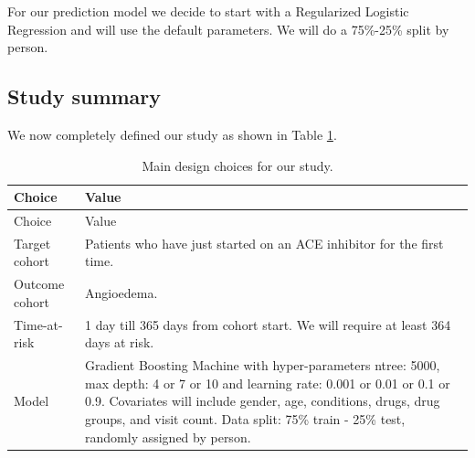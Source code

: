 \documentclass[11pt]{book}
\begin{document}
For our prediction model we decide to start with a Regularized Logistic
Regression and will use the default parameters. We will do a 75\%-25\%
split by person.

\subsection{Study summary}\label{study-summary-1}

We now completely defined our study as shown in Table
\ref{tab:plpSummary}.

\begin{longtable}[]{@{}ll@{}}
\caption{\label{tab:plpSummary} Main design choices for our
study.}\tabularnewline
\toprule
\begin{minipage}[b]{0.23\columnwidth}\raggedright\strut
Choice\strut
\end{minipage} & \begin{minipage}[b]{0.71\columnwidth}\raggedright\strut
Value\strut
\end{minipage}\tabularnewline
\midrule
\endfirsthead
\toprule
\begin{minipage}[b]{0.23\columnwidth}\raggedright\strut
Choice\strut
\end{minipage} & \begin{minipage}[b]{0.71\columnwidth}\raggedright\strut
Value\strut
\end{minipage}\tabularnewline
\midrule
\endhead
\begin{minipage}[t]{0.23\columnwidth}\raggedright\strut
Target cohort\strut
\end{minipage} & \begin{minipage}[t]{0.71\columnwidth}\raggedright\strut
Patients who have just started on an ACE inhibitor for the first
time.\strut
\end{minipage}\tabularnewline
\begin{minipage}[t]{0.23\columnwidth}\raggedright\strut
Outcome cohort\strut
\end{minipage} & \begin{minipage}[t]{0.71\columnwidth}\raggedright\strut
Angioedema.\strut
\end{minipage}\tabularnewline
\begin{minipage}[t]{0.23\columnwidth}\raggedright\strut
Time-at-risk\strut
\end{minipage} & \begin{minipage}[t]{0.71\columnwidth}\raggedright\strut
1 day till 365 days from cohort start. We will require at least 364 days
at risk.\strut
\end{minipage}\tabularnewline
\begin{minipage}[t]{0.23\columnwidth}\raggedright\strut
Model\strut
\end{minipage} & \begin{minipage}[t]{0.71\columnwidth}\raggedright\strut
Gradient Boosting Machine with hyper-parameters ntree: 5000, max depth:
4 or 7 or 10 and learning rate: 0.001 or 0.01 or 0.1 or 0.9. Covariates
will include gender, age, conditions, drugs, drug groups, and visit
count. Data split: 75\% train - 25\% test, randomly assigned by
person.\strut
\end{minipage}\tabularnewline
\bottomrule
\end{longtable}
\end{document}
